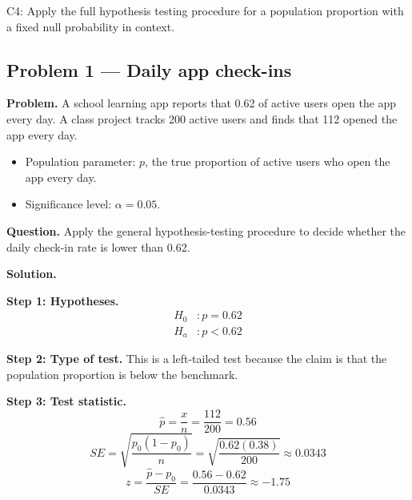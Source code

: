 


\begin{ExamCriteria}
    \item C4: Apply the full hypothesis testing procedure for a population proportion with a fixed null probability in context.
\end{ExamCriteria}

\begin{ExamProblems}

\hypertarget{c4-ex1}{}
\item
\subsection*{Problem 1 — Daily app check-ins}

\textbf{Problem.} A school learning app reports that 0.62 of active users open the app every day. A class project tracks 200 active users and finds that 112 opened the app every day.
\begin{itemize}
    \item Population parameter: \(p\), the true proportion of active users who open the app every day.
    \item Significance level: \(\alpha=0.05\).
\end{itemize}

\textbf{Question.} Apply the general hypothesis-testing procedure to decide whether the daily check-in rate is lower than 0.62.

\textbf{Solution.}

\textbf{Step 1: Hypotheses.}
\[
\begin{aligned}
H_0&: p = 0.62 \\
H_a&: p < 0.62
\end{aligned}
\]

\textbf{Step 2: Type of test.} This is a left-tailed test because the claim is that the population proportion is below the benchmark.

\textbf{Step 3: Test statistic.}
\[
\hat{p}=\frac{x}{n}=\frac{112}{200}=0.56
\]
\[
SE=\sqrt{\frac{p_0(1-p_0)}{n}}=\sqrt{\frac{0.62(0.38)}{200}}\approx 0.0343
\]
\[
z=\frac{\hat{p}-p_0}{SE}=\frac{0.56-0.62}{0.0343}\approx -1.75
\]


\end{ExamProblems}
